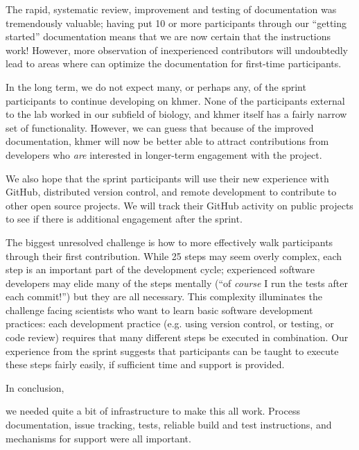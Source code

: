 \documentclass[12pt]{article}
\begin{document}
The rapid, systematic review, improvement and testing of documentation
was tremendously valuable; having put 10 or more participants through
our ``getting started'' documentation means that we are now certain
that the instructions work!  However, more observation of
inexperienced contributors will undoubtedly lead to areas where can
optimize the documentation for first-time participants.

In the long term, we do not expect many, or perhaps any, of the sprint
participants to continue developing on khmer.  None of the
participants external to the lab worked in our subfield of biology,
and khmer itself has a fairly narrow set of functionality.  However,
we can guess that because of the improved documentation, khmer will
now be better able to attract contributions from developers who {\em
  are} interested in longer-term engagement with the project.

We also hope that the sprint participants will use their new experience
with GitHub, distributed version control, and remote development to
contribute to other open source projects.  We will track their
GitHub activity on public projects to see if there is additional
engagement after the sprint.

The biggest unresolved challenge is how to more effectively walk
participants through their first contribution.  While 25 steps may
seem overly complex, each step is an important part of the development
cycle; experienced software developers may elide many of the steps
mentally (``of {\em course} I run the tests after each commit!'') but
they are all necessary.  This complexity illuminates the challenge
facing scientists who want to learn basic software development
practices: each development practice (e.g. using version control, or
testing, or code review) requires that many different steps be
executed in combination.  Our experience from the sprint suggests
that participants can be taught to execute these steps fairly easily,
if sufficient time and support is provided.



In conclusion,

we needed quite a bit of infrastructure to make this all work.
Process documentation, issue tracking, tests, reliable build and test
instructions, and mechanisms for support were all important.
\end{document}
